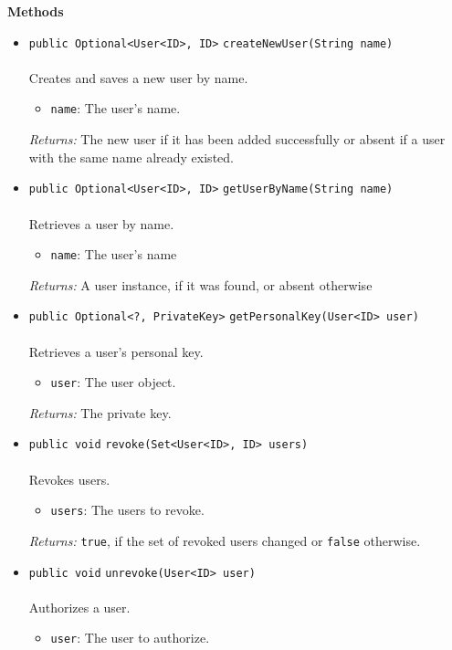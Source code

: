 \textbf{\sffamily Methods}
\begin{itemize}
\item \lstinline|public Optional<User<ID>, ID>| \lstinline|createNewUser|\lstinline|(String name)|\\ \\[-0.6em]
Creates and saves a new user by name.
\begin{itemize}
\item \lstinline|name|: The user's name.
\end{itemize}

\emph{Returns:} The new user if it has been added successfully or absent
         if a user with the same name already existed.

\item \lstinline|public Optional<User<ID>, ID>| \lstinline|getUserByName|\lstinline|(String name)|\\ \\[-0.6em]
Retrieves a user by name.
\begin{itemize}
\item \lstinline|name|: The user's name
\end{itemize}

\emph{Returns:} A user instance, if it was found, or absent otherwise

\item \lstinline|public Optional<?, PrivateKey>| \lstinline|getPersonalKey|\lstinline|(User<ID> user)|\\ \\[-0.6em]
Retrieves a user's personal key.
\begin{itemize}
\item \lstinline|user|: The user object.
\end{itemize}

\emph{Returns:} The private key.

\item \lstinline|public void| \lstinline|revoke|\lstinline|(Set<User<ID>, ID> users)|\\ \\[-0.6em]
Revokes users.
\begin{itemize}
\item \lstinline|users|: The users to revoke.
\end{itemize}

\emph{Returns:} \lstinline|true|, if the set of revoked users changed or \lstinline|false| otherwise.

\item \lstinline|public void| \lstinline|unrevoke|\lstinline|(User<ID> user)|\\ \\[-0.6em]
Authorizes a user.
\begin{itemize}
\item \lstinline|user|: The user to authorize.
\end{itemize}


\end{itemize}
